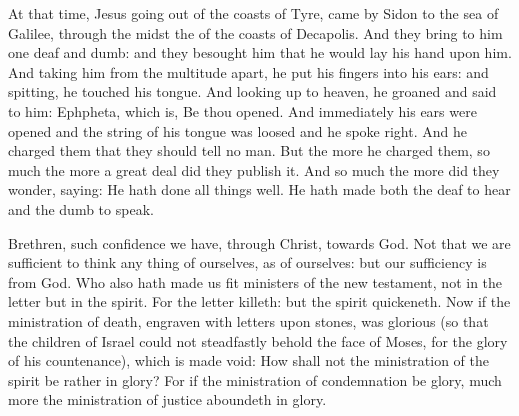 \begin{multicols}{2}

At that time, Jesus going out of the coasts of Tyre, came by Sidon to the
sea of Galilee, through the midst the of the coasts of Decapolis.
And they bring to him one deaf and dumb: and they besought him
that he would lay his hand upon him.
And taking him from the multitude apart, he put his fingers into
his ears: and spitting, he touched his tongue.
And looking up to heaven, he groaned and said to him: Ephpheta,
which is, Be thou opened.
And immediately his ears were opened and the string of his tongue
was loosed and he spoke right.
And he charged them that they should tell no man. But the more he
charged them, so much the more a great deal did they publish it.
And so much the more did they wonder, saying: He hath done all
things well. He hath made both the deaf to hear and the dumb to speak.


\bigskip



Brethren, such confidence we have, through Christ, towards God.
Not that we are sufficient to think any thing of ourselves, as of
ourselves: but our sufficiency is from God.
Who also hath made us fit ministers of the new testament, not in
the letter but in the spirit. For the letter killeth: but the spirit
quickeneth.
Now if the ministration of death, engraven with letters upon
stones, was glorious (so that the children of Israel could not
steadfastly behold the face of Moses, for the glory of his countenance),
which is made void:
How shall not the ministration of the spirit be rather in glory?
For if the ministration of condemnation be glory, much more the
ministration of justice aboundeth in glory.




\end{multicols}
